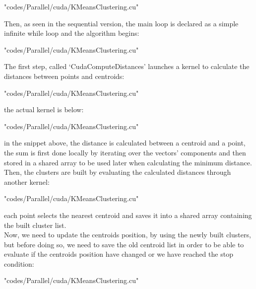 \documentclass[10pt,twocolumn,letterpaper]{article}
\begin{document}
\begin{lstinputlisting}[language=C,style=CSnippetStyle,caption=CUDA Main Initialization Code,firstline=271,lastline=279]{
	"codes/Parallel/cuda/KMeansClustering.cu"}
\end{lstinputlisting}
Then, as seen in the sequential version, the main loop is declared as a simple infinite while loop and the algorithm begins:\\
\begin{lstinputlisting}[language=C,style=CSnippetStyle,caption=CUDA Main Loop,firstline=283,lastline=294]{
	"codes/Parallel/cuda/KMeansClustering.cu"}
\end{lstinputlisting}
The first step, called `CudaComputeDistances' launches a kernel to calculate the distances between points and centroids:
\begin{lstinputlisting}[language=C,style=CSnippetStyle,caption=CUDA Distance Calculator Kernel Launcher,firstline=131,lastline=140]{
	"codes/Parallel/cuda/KMeansClustering.cu"}
\end{lstinputlisting}
the actual kernel is below:\\
\begin{lstinputlisting}[language=C,style=CSnippetStyle,caption=CUDA Distance Calculator Kernel,firstline=80,lastline=102]{
	"codes/Parallel/cuda/KMeansClustering.cu"}
\end{lstinputlisting}
in the snippet above, the distance is calculated between a centroid and a point, the sum is first done locally by iterating over the 
vectors' components and then stored in a shared array to be used later when calculating the minimum distance.\\
Then, the clusters are built by evaluating the calculated distances through another kernel:\\
\begin{lstinputlisting}[language=C,style=CSnippetStyle,caption=CUDA Cluster Builder Kernel,firstline=59,lastline=78]{
	"codes/Parallel/cuda/KMeansClustering.cu"}
\end{lstinputlisting}
each point selects the nearest centroid and saves it into a shared array containing the built cluster list.\\
Now, we need to update the centroids position, by using the newly built clusters, but before doing so, we need to save the old centroid 
list in order to be able to evaluate if the centroids position have changed or we have reached the stop condition:\\
\begin{lstinputlisting}[language=C,style=CSnippetStyle,caption=CUDA Centroid List Saving,firstline=286,lastline=286]{
	"codes/Parallel/cuda/KMeansClustering.cu"}
\end{lstinputlisting}
\end{document}
